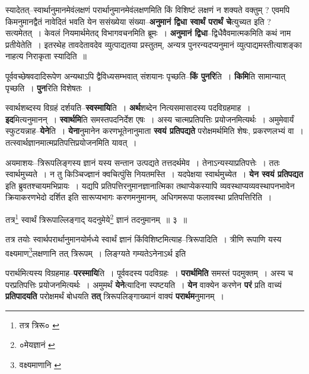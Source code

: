 \documentclass[article,12pt,a4paper]{memoir}
\begin{document}
	  \pstart स्यादेतत्--स्वार्थानुमानमेवंलक्षणं परार्थानुमानमेवंलक्षणमिति किं विशिष्टं लक्षणं न शक्यते वक्तुम् ? एवमपि किमनुमानद्वैतं नावेदितं भवति येन ससंख्येया संख्या--\textbf{अनुमानं द्विधा स्वार्थं परार्थं चे}त्युच्यत इति ? सत्यमेतत् । केवलं नियमार्थमेतद् विभागवचनमिति ब्रूमः । \textbf{अनुमानं द्विधा}--द्विधैवैवमात्मकमिति कथं नाम \leavevmode{} प्रतीयेतेति । इतरथेह तावदेतावदेव व्युत्पाद्यतया प्रस्तुतम्, अन्यत्र पुनरन्यदप्यनुमानं व्युत्पाद्यमस्तीत्याशङ्का नाहत्य निराकृता स्यादिति ॥
	\pend
      

	  \pstart पूर्ववच्छेषवदादिरूपेण अन्यथाऽपि द्वैविध्यसम्भवात् संशयानः पृच्छति--\textbf{किं पुनरि}ति । \textbf{किमि}ति सामान्यात् पृच्छति । \textbf{पुन}रिति विशेषतः ।
	\pend
      

	  \pstart स्वार्थशब्दस्य विग्रहं दर्शयति--\textbf{स्वस्मायि}ति । \textbf{अर्थ}शब्देन नित्यसमासादस्य पदविग्रहमाह । \textbf{इद}मित्यनुमानन् । \textbf{स्वार्थमि}ति समस्तपदनिर्देश एषः । अस्य चात्मप्रतिपत्तिः प्रयोजनमित्यर्थः । अमुमेवार्यं स्फुटयन्नाह--\textbf{येने}ति । \textbf{येना}नुमानेन करणभूतेनानुमाता \textbf{स्वयं प्रतिपद्यते} परोक्षमर्थमिति शेषः, प्रकरणलभ्यं वा । तत्स्वार्थज्ञानमात्मप्रतिपत्तिप्रयोजनमिति यावत् ।
	\pend
      

	  \pstart अयमाशयः--त्रिरूपलिङ्गस्य ज्ञानं यस्य सन्तान उत्पद्यते तत्तदर्थमेव । तेनाऽन्यस्याप्रतिपत्तेः । ततः स्वार्थमुच्यते । न तु किञ्चिज्ज्ञानं क्वचित्पुंसि नियतमस्ति । यदपेक्षया स्वार्थमुच्येत । \textbf{येन स्वयं प्रतिपद्यत} इति ब्रुवतश्चायमभिप्रायः । यद्यपि प्रतिपत्तिरनुमानज्ञानात्मिका तथाप्येकस्यापि व्यवस्थाप्यव्यवस्थापनभावेन क्रियाकरणभेदो दर्शित इति सारूप्यभागः करणमनुमानम्, अधिगमरूपा फलावस्था प्रतिपत्तिरिति ।
	\pend
      \leavevmode{}
	  \bigskip
	  \begingroup
	

	  \pstart तत्र\footnote{तत्र त्रिरू० \cite{dp-edE}} स्वार्थं त्रिरूपाल्लिङ्गाद् यदनुमेये\footnote{०मेयज्ञानं \cite{dp-msC}} ज्ञानं तदनुमानम् ॥ ३ ॥
	\pend
      
	  \endgroup
	
	  \bigskip
	  \begingroup
	

	  \pstart तत्र तयोः स्वार्थपरार्थानुमानयोर्मध्ये स्वार्थं ज्ञानं किंविशिष्टमित्याह--त्रिरूपादिति । त्रीणि रूपाणि यस्य वक्ष्यमाण\footnote{वक्ष्यमाणानि \cite{dp-msD}}लक्षणानि तत् त्रिरूपम् । लिङ्ग्यते गम्यतेऽनेनाऽर्थ इति
	\pend
      
	  \endgroup
	

	  \pstart परार्थमित्यस्य विग्रहमाह--\textbf{परस्मायि}ति । पूर्ववदस्य पदविग्रहः । \textbf{परार्थमिति} समस्तं पदमुक्तम् । अस्य च परप्रतिपत्तिः प्रयोजनमित्यर्थः । अमुमर्थं \textbf{येने}त्यादिना स्पष्टयति । \textbf{येन} वाक्येन करणेन \textbf{परं} प्रति वाच्यं \textbf{प्रतिपादयति} परोक्षमर्थं बोधयति \textbf{तत्} त्रिरूपलिङ्गाख्यानं वाक्यं \textbf{परार्थम}नुमानम् ।
	\pend
      
\end{document}

